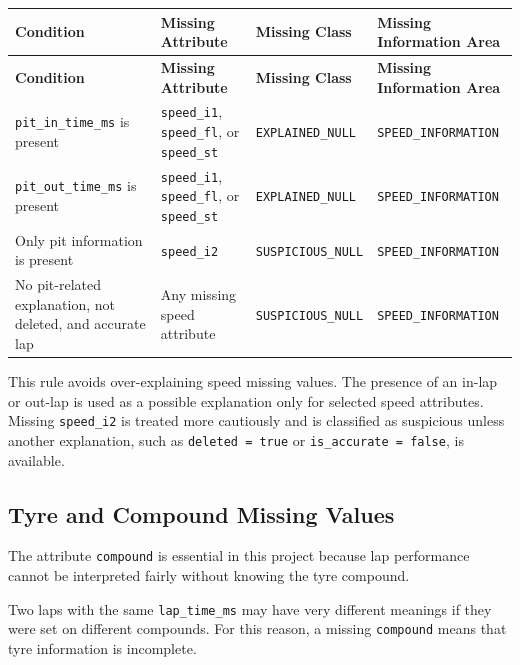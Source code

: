 \documentclass[a4paper,11pt]{article}
\begin{document}
	\begin{longtable}{p{4cm}p{5cm}p{3cm}p{4cm}}
		\toprule
		\textbf{Condition} & \textbf{Missing Attribute} & \textbf{Missing Class} & \textbf{Missing Information Area} \\
		\midrule
		\endfirsthead
		
		\toprule
		\textbf{Condition} & \textbf{Missing Attribute} & \textbf{Missing Class} & \textbf{Missing Information Area} \\
		\midrule
		\endhead
		
		\texttt{pit\_in\_time\_ms} is present
		& \texttt{speed\_i1}, \texttt{speed\_fl}, or \texttt{speed\_st}
		& \texttt{EXPLAINED\_NULL}
		& \texttt{SPEED\_INFORMATION} \\
		\midrule
		
		\texttt{pit\_out\_time\_ms} is present
		& \texttt{speed\_i1}, \texttt{speed\_fl}, or \texttt{speed\_st}
		& \texttt{EXPLAINED\_NULL}
		& \texttt{SPEED\_INFORMATION} \\
		\midrule
		
		
		Only pit information is present
		& \texttt{speed\_i2}
		& \texttt{SUSPICIOUS\_NULL}
		& \texttt{SPEED\_INFORMATION} \\
		\midrule
		
		No pit-related explanation, not deleted, and accurate lap
		& Any missing speed attribute
		& \texttt{SUSPICIOUS\_NULL}
		& \texttt{SPEED\_INFORMATION} \\
		\bottomrule
	\end{longtable}
	
	This rule avoids over-explaining speed missing values.
	The presence of an in-lap or out-lap is used as a possible explanation only for selected speed attributes.
	Missing \texttt{speed\_i2} is treated more cautiously and is classified as suspicious unless another explanation, such as \texttt{deleted = true} or \texttt{is\_accurate = false}, is available.

	
	\subsection{Tyre and Compound Missing Values}
	
	The attribute \texttt{compound} is essential in this project because lap performance cannot be interpreted fairly without knowing the tyre compound.
	
	Two laps with the same \texttt{lap\_time\_ms} may have very different meanings if they were set on different compounds.
	For this reason, a missing \texttt{compound} means that tyre information is incomplete.
	
\end{document}
